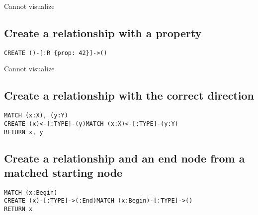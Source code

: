 Cannot visualize
\subsection{Create a relationship with a property}

\begin{lstlisting}
CREATE ()-[:R {prop: 42}]->()
\end{lstlisting}

Cannot visualize
\subsection{Create a relationship with the correct direction}

\begin{lstlisting}
MATCH (x:X), (y:Y)
CREATE (x)<-[:TYPE]-(y)MATCH (x:X)<-[:TYPE]-(y:Y)
RETURN x, y
\end{lstlisting}

\subsection{Create a relationship and an end node from a matched starting node}

\begin{lstlisting}
MATCH (x:Begin)
CREATE (x)-[:TYPE]->(:End)MATCH (x:Begin)-[:TYPE]->()
RETURN x
\end{lstlisting}


